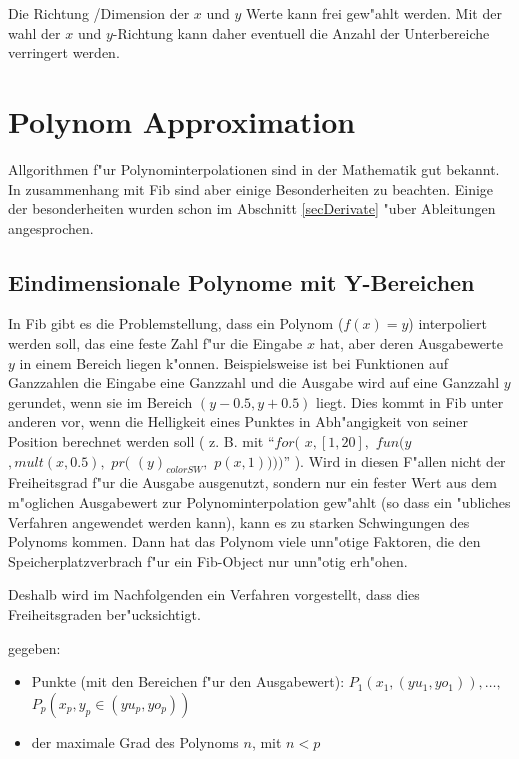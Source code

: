 Die Richtung /Dimension der $x$ und $y$ Werte kann frei gew"ahlt werden. Mit der wahl der $x$ und $y$-Richtung kann daher eventuell die Anzahl der Unterbereiche verringert werden.



\section{Polynom Approximation}

Allgorithmen f"ur Polynominterpolationen sind in der Mathematik gut bekannt. In zusammenhang mit Fib sind aber einige Besonderheiten zu beachten. Einige der besonderheiten wurden schon im Abschnitt \ref{secDerivate} "uber Ableitungen angesprochen.


\subsection{Eindimensionale Polynome mit Y-Bereichen}

In Fib gibt es die Problemstellung, dass ein Polynom ($f(x)=y$) interpoliert werden soll, das eine feste Zahl f"ur die Eingabe $x$ hat, aber deren Ausgabewerte $y$ in einem Bereich liegen k"onnen. Beispielsweise ist bei Funktionen auf Ganzzahlen die Eingabe eine Ganzzahl und die Ausgabe wird auf eine Ganzzahl $y$ gerundet, wenn sie im Bereich $(y-0.5, y+0.5)$ liegt. Dies kommt in Fib unter anderen vor, wenn die Helligkeit eines Punktes in Abh"angigkeit von seiner Position berechnet werden soll ( z. B. mit ``$for($ $x, [1, 20],$ $fun( y$ $,mult(x,0.5),$ $pr($ $(y)_{colorSW},$ $p(x,1) ) ) )$'' ). Wird in diesen F"allen nicht der Freiheitsgrad f"ur die Ausgabe ausgenutzt, sondern nur ein fester Wert aus dem m"oglichen Ausgabewert zur Polynominterpolation gew"ahlt (so dass ein "ubliches Verfahren angewendet werden kann), kann es zu starken Schwingungen des Polynoms kommen. Dann hat das Polynom viele unn"otige Faktoren, die den Speicherplatzverbrach f"ur ein Fib-Object nur unn"otig erh"ohen.

Deshalb wird im Nachfolgenden ein Verfahren vorgestellt, dass dies Freiheitsgraden ber"ucksichtigt.

\bigskip\noindent
gegeben:
\begin{itemize}
 \item Punkte (mit den Bereichen f"ur den Ausgabewert): $P_1( x_1, (yu_1,yo_1 )), \ldots,$ $P_p( x_p, y_p \in (yu_p,yo_p ))$
 \item der maximale Grad des Polynoms $n$, mit $n < p$
\end{itemize}

